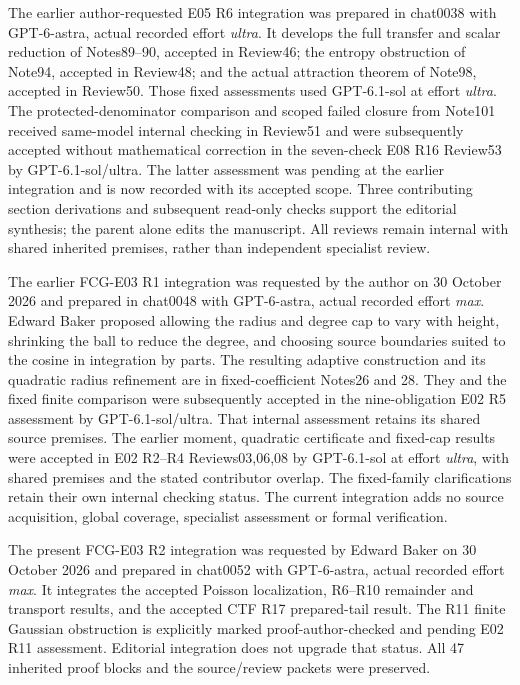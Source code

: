 \documentclass[11pt]{article}
\numberwithin{equation}{section}
\begin{document}
The earlier author-requested E05 R6 integration was prepared in
chat0038 with GPT-6-astra, actual recorded effort \emph{ultra}.
It develops the full transfer and scalar reduction of Notes89--90,
accepted in Review46; the entropy obstruction of Note94, accepted in
Review48; and the actual attraction theorem of Note98, accepted in
Review50. Those fixed assessments used GPT-6.1-sol at effort
\emph{ultra}. The protected-denominator comparison and scoped failed
closure from Note101 received same-model internal checking in Review51
and were subsequently accepted without mathematical correction in
the seven-check E08 R16 Review53 by GPT-6.1-sol/ultra. The latter
assessment was pending at the earlier integration and is now recorded
with its accepted scope. Three contributing section derivations
and subsequent read-only checks support the editorial synthesis; the
parent alone edits the manuscript. All reviews remain internal with
shared inherited premises, rather than independent specialist review.

The earlier FCG-E03 R1 integration was requested by the author on
30 October 2026 and prepared in chat0048 with GPT-6-astra, actual
recorded effort \emph{max}. Edward Baker proposed allowing the radius
and degree cap to vary with height, shrinking the ball to reduce the
degree, and choosing source boundaries suited to the cosine in
integration by parts. The resulting adaptive construction and its
quadratic radius refinement are in fixed-coefficient Notes26 and 28.
They and the fixed finite comparison were subsequently accepted in
the nine-obligation E02 R5 assessment by GPT-6.1-sol/ultra.
That internal assessment retains its shared source premises. The earlier moment, quadratic
certificate and fixed-cap results were accepted in E02 R2--R4
Reviews03,06,08 by GPT-6.1-sol at effort \emph{ultra}, with shared
premises and the stated contributor overlap. The fixed-family
clarifications retain their own internal checking status.
The current integration adds no source acquisition, global coverage,
specialist assessment or formal verification.

The present FCG-E03 R2 integration was requested by Edward Baker on
30 October 2026 and prepared in chat0052 with GPT-6-astra, actual
recorded effort \emph{max}. It integrates the accepted Poisson
localization, R6--R10 remainder and transport results, and the accepted
CTF R17 prepared-tail result. The R11 finite Gaussian obstruction is
explicitly marked proof-author-checked and pending E02 R11 assessment.
Editorial integration does not upgrade that status. All 47 inherited
proof blocks and the source/review packets were preserved.
\end{document}
